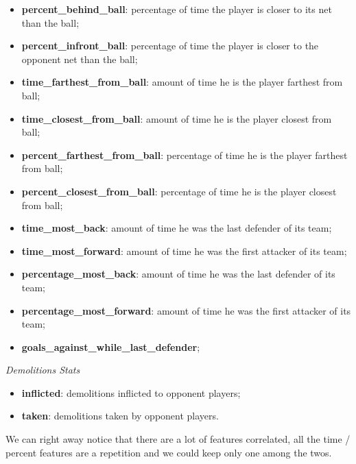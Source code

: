 \begin{itemize}
    \item \textbf{percent\_behind\_ball}: percentage of time the player is closer to its net than the ball; \\
    \item \textbf{percent\_infront\_ball}: percentage of time the player is closer to the opponent net than the ball; \\
    \item \textbf{time\_farthest\_from\_ball}: amount of time he is the player farthest from ball; \\
    \item \textbf{time\_closest\_from\_ball}: amount of time he is the player closest from ball; \\
    \item \textbf{percent\_farthest\_from\_ball}: percentage of time he is the player farthest from ball; \\
    \item \textbf{percent\_closest\_from\_ball}: percentage of time he is the player closest from ball; \\
    \item \textbf{time\_most\_back}: amount of time he was the last defender of its team; \\
    \item \textbf{time\_most\_forward}: amount of time he was the first attacker of its team; \\
    \item \textbf{percentage\_most\_back}: amount of time he was the last defender of its team; \\
    \item \textbf{percentage\_most\_forward}: amount of time he was the first attacker of its team; \\
    \item \textbf{goals\_against\_while\_last\_defender};
\end{itemize}
\begin{center}
    \textit{Demolitions Stats}
\end{center}
\begin{itemize}
    \item \textbf{inflicted}: demolitions inflicted to opponent players;
    \item \textbf{taken}: demolitions taken by opponent players.
\end{itemize}

We can right away notice that there are a lot of features correlated, all the time / percent features are a repetition and we could keep only one among the twos.